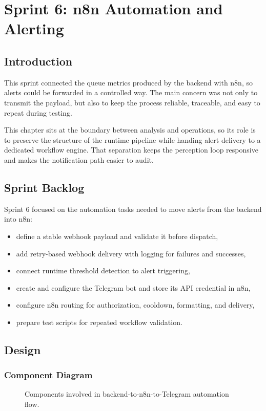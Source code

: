 \chapter{Sprint 6: n8n Automation and Alerting}
\chaptertoc

\clearpage

\section{Introduction}
This sprint connected the queue metrics produced by the backend with n8n, so alerts could be forwarded in a controlled way. The main concern was not only to transmit the payload, but also to keep the process reliable, traceable, and easy to repeat during testing.

This chapter sits at the boundary between analysis and operations, so its role is to preserve the structure of the runtime pipeline while handing alert delivery to a dedicated workflow engine. That separation keeps the perception loop responsive and makes the notification path easier to audit.

\section{Sprint Backlog}
Sprint 6 focused on the automation tasks needed to move alerts from the backend into n8n:
\begin{itemize}
    \item define a stable webhook payload and validate it before dispatch,
    \item add retry-based webhook delivery with logging for failures and successes,
    \item connect runtime threshold detection to alert triggering,
    \item create and configure the Telegram bot and store its API credential in n8n,
    \item configure n8n routing for authorization, cooldown, formatting, and delivery,
    \item prepare test scripts for repeated workflow validation.
\end{itemize}

\section{Design}

\subsection{Component Diagram}
\begin{figure}[H]
    \centering
    \caption{Components involved in backend-to-n8n-to-Telegram automation flow.}
    \label{fig:sprint6_component}
\end{figure}

